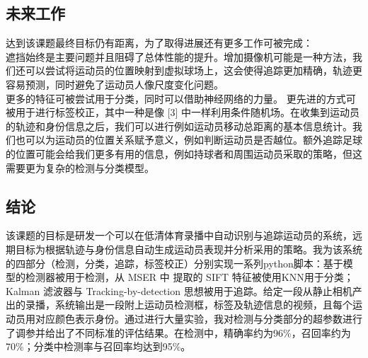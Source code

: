 \documentclass{article}
\begin{document}
\subsection{未来工作}
达到该课题最终目标仍有距离，为了取得进展还有更多工作可被完成：\\
遮挡始终是主要问题并且阻碍了总体性能的提升。增加摄像机可能是一种方法，我们还可以尝试将运动员的位置映射到虚拟球场上，这会使得追踪更加精确，轨迹更容易预测，同时避免了运动员人像尺度变化问题。\\更多的特征可被尝试用于分类，同时可以借助神经网络的力量。
更先进的方式可被用于进行标签校正，其中一种是像 [3] 中一样利用条件随机场。在收集到运动员的轨迹和身份信息之后，我们可以进行例如运动员移动总距离的基本信息统计。我们也可以为运动员的位置关系赋予意义，例如判断运动员是否越位。额外追踪足球的位置可能会给我们更多有用的信息，例如持球者和周围运动员采取的策略，但这需要更为复杂的检测与分类模型。
\subsection{结论}
该课题的目标是研发一个可以在低清体育录播中自动识别与追踪运动员的系统，远期目标为根据轨迹与身份信息自动生成运动员表现并分析采用的策略。我为该系统的四部分（检测，分类，追踪，标签校正）分别实现一系列python脚本：基于模型的检测器被用于检测，从 MSER 中 提取的 SIFT 特征被使用KNN用于分类；Kalman 滤波器与 Tracking-by-detection 思想被用于追踪。给定一段从静止相机产出的录播，系统输出是一段附上运动员检测框，标签及轨迹信息的视频，且每个运动员用对应颜色表示身份。通过进行大量实验，我对检测与分类部分的超参数进行了调参并给出了不同标准的评估结果。在检测中，精确率约为96\%，召回率约为70\%；分类中检测率与召回率均达到95\%。
\newpage
\end{document}
